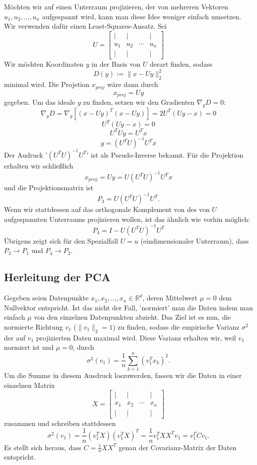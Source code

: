 \documentclass{article}
\begin{document}
Möchten wir auf einen Unterraum projizieren, der von mehreren Vektoren \(u_1,u_2,...,u_n\) aufgespannt wird, kann man diese Idee weniger einfach umsetzen. Wir verwenden dafür einen Least-Squares-Ansatz. Sei \[U=\begin{bmatrix}
    |&|&&|\\u_1&u_2&\cdots&u_n\\|&|&&|
\end{bmatrix}\]Wir möchten Koordinaten \(y\) in der Basis von \(U\) derart finden, sodass \[
D(y):=\|x-Uy\|_2^2
\]minimal wird. Die Projetion \(x_{proj}\) wäre dann durch\[
x_{proj}=Uy
\]gegeben. Um das ideale \(y\) zu finden, setzen wir den Gradienten \(\nabla_y D=0\):\[
\nabla_y D=\nabla_y[(x-Uy)^T(x-Uy)]=2U^T(Uy-x)=0
\]\[
U^T(Uy-x)=0
\]\[
U^TUy=U^Tx
\]\[
y=(U^TU)^{-1}U^Tx
\]Der Audruck '\((U^TU)^{-1}U^T\)' ist als Pseudo-Inverse bekannt. Für die Projektion erhalten wir schließlich\[
x_{proj}=Uy=U(U^TU)^{-1}U^Tx
\]und die Projektionsmatrix ist\[
P_3=U(U^TU)^{-1}U^T.
\]Wenn wir stattdessen auf das orthogonale Komplement von des von \(U\) aufgespannten Unterraums projizieren wollen, ist das ähnlich wie vorhin möglich:
\[
P_4=I-U(U^TU)^{-1}U^T
\]
Übrigens zeigt sich für den Spezialfall \(U=u\) (eindimensionaler Unterraum), dass \(P_3\rightarrow P_1\) und \(P_4\rightarrow P_2\).

\subsection{Herleitung der PCA}
Gegeben seien Datenpunkte \(x_1,x_2,...,x_n\in\mathbb R^d\), deren Mittelwert \(\mu=0\) dem Nullvektor entspricht. Ist das nicht der Fall, 'normiert' man die Daten indem man einfach \(\mu\) von den einzelnen Datenpunkten abzieht. Das Ziel ist es nun, die normierte Richtung \(v_1\) (\(\|v_1\|_2=1\)) zu finden, sodass die empirische Varianz \(\sigma^2\) der auf \(v_1\) projizierten Daten maximal wird. Diese Varianz erhalten wir, weil \(v_1\) normiert ist und \(\mu=0\), durch
\[
\sigma^2(v_1)=\frac1n\sum\limits_{k=1}^n (v_1^Tx_k)^2.
\]Um die Summe in diesem Ausdruck loszuwerden, fassen wir die Daten in einer einzelnen Matrix\[
X=\begin{bmatrix}
    |&|&&|\\x_1&x_2&\cdots&x_n\\|&|&&|
\end{bmatrix}
\]zusammen und schreiben stattdessen\[
\sigma^2(v_1)=\frac1n(v_1^TX)(v_1^TX)^T=\frac1nv_1^TXX^Tv_1=v_1^TCv_1.
\]
Es stellt sich heraus, dass \(C=\frac1nXX^T\) genau der Covarianz-Matrix der Daten entspricht.
\end{document}
